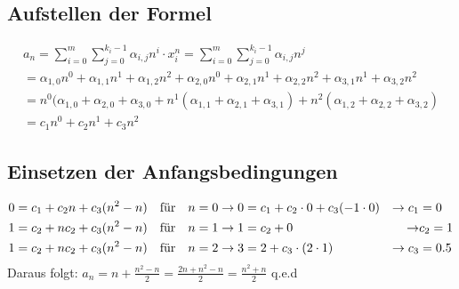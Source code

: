 \documentclass[a4paper,10pt,freqn]{article}
\begin{document}
\subsection{Aufstellen der Formel}
\begin{eqnarray*}
 a_n = \sum_{i=0}^m\sum_{j=0}^{k_i-1} \alpha_{i,j}n^i
 \cdot x_i^n  =\sum_{i=0}^m\sum_{j=0}^{k_i-1} \alpha_{i,j}n^j\\
 =\alpha_{1,0}n^0+\alpha_{1,1}n^1+\alpha_{1,2}n^2+\alpha_{2,0}n^0+\alpha_{2,1}n^1+\alpha_{2,2}n^2+\alpha_{3,1}n^1+\alpha_{3,2}n^2\\=
 n^0(\alpha_{1,0}+\alpha_{2,0}+\alpha_{3,0}+n^1(\alpha_{1,1}+\alpha_{2,1}+\alpha_{3,1})+n^2(\alpha_{1,2}+\alpha_{2,2}+\alpha_{3,2})\\=
 c_1n^0+c_2n^1+c_3n^2
\end{eqnarray*}

\subsection{Einsetzen der Anfangsbedingungen}
\begin{align*}
 0&=c_1+c_2n+c_3(n^2-n) &\text{für\quad}& n = 0\rightarrow 0 = c_1+c_2\cdot0+c_3(-1\cdot0) &\rightarrow c_1& = 0\\
 1&=c_2+nc_2+c_3(n^2-n) &\text{für\quad}& n = 1\rightarrow 1 = c_2+0 &\rightarrow& c_2 = 1\\
 1&=c_2+nc_2+c_3(n^2-n) &\text{für\quad}& n = 2\rightarrow 3 = 2+c_3\cdot(2\cdot1) &\rightarrow c_3& = 0.5\\
\end{align*}
Daraus folgt: $a_n = n+\frac{n^2-n}{2}=\frac{2n+n^2-n}{2}=\frac{n^2+n}{2}$ q.e.d
\end{document}
